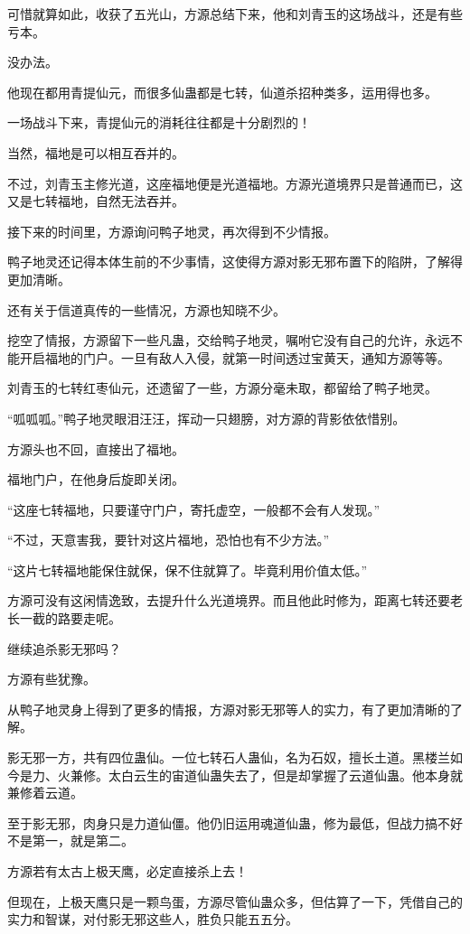 \begin{this_body}
可惜就算如此，收获了五光山，方源总结下来，他和刘青玉的这场战斗，还是有些亏本。

没办法。

他现在都用青提仙元，而很多仙蛊都是七转，仙道杀招种类多，运用得也多。

一场战斗下来，青提仙元的消耗往往都是十分剧烈的！

当然，福地是可以相互吞并的。

不过，刘青玉主修光道，这座福地便是光道福地。方源光道境界只是普通而已，这又是七转福地，自然无法吞并。

接下来的时间里，方源询问鸭子地灵，再次得到不少情报。

鸭子地灵还记得本体生前的不少事情，这使得方源对影无邪布置下的陷阱，了解得更加清晰。

还有关于信道真传的一些情况，方源也知晓不少。

挖空了情报，方源留下一些凡蛊，交给鸭子地灵，嘱咐它没有自己的允许，永远不能开启福地的门户。一旦有敌人入侵，就第一时间透过宝黄天，通知方源等等。

刘青玉的七转红枣仙元，还遗留了一些，方源分毫未取，都留给了鸭子地灵。

“呱呱呱。”鸭子地灵眼泪汪汪，挥动一只翅膀，对方源的背影依依惜别。

方源头也不回，直接出了福地。

福地门户，在他身后旋即关闭。

“这座七转福地，只要谨守门户，寄托虚空，一般都不会有人发现。”

“不过，天意害我，要针对这片福地，恐怕也有不少方法。”

“这片七转福地能保住就保，保不住就算了。毕竟利用价值太低。”

方源可没有这闲情逸致，去提升什么光道境界。而且他此时修为，距离七转还要老长一截的路要走呢。

继续追杀影无邪吗？

方源有些犹豫。

从鸭子地灵身上得到了更多的情报，方源对影无邪等人的实力，有了更加清晰的了解。

影无邪一方，共有四位蛊仙。一位七转石人蛊仙，名为石奴，擅长土道。黑楼兰如今是力、火兼修。太白云生的宙道仙蛊失去了，但是却掌握了云道仙蛊。他本身就兼修着云道。

至于影无邪，肉身只是力道仙僵。他仍旧运用魂道仙蛊，修为最低，但战力搞不好不是第一，就是第二。

方源若有太古上极天鹰，必定直接杀上去！

但现在，上极天鹰只是一颗鸟蛋，方源尽管仙蛊众多，但估算了一下，凭借自己的实力和智谋，对付影无邪这些人，胜负只能五五分。


\end{this_body}
